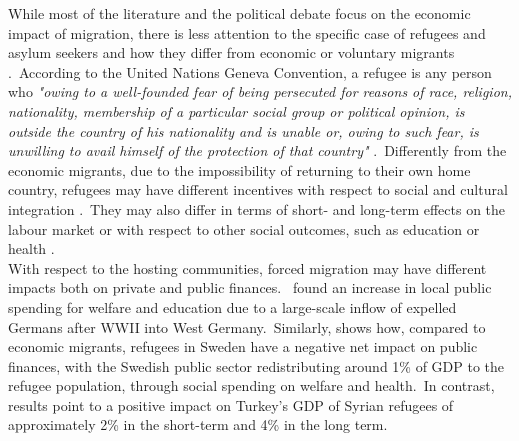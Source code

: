 \documentclass[authoryear,preprint,review,12pt]{elsarticle}
\begin{document}
\noindent
While most of the literature and the political debate focus on the economic impact of migration, there is less attention to the specific case of refugees and asylum seekers and how they differ from economic or voluntary migrants \citep{becker2019}.\ According to the United Nations Geneva Convention, a refugee is any person who \textit{"owing to a well-founded fear of being persecuted for reasons of race, religion, nationality, membership of a particular social group or political opinion, is outside the country of his nationality and is unable or, owing to such fear, is unwilling to avail himself of the protection of that country"} \citep{convention1951}.\ Differently from the economic migrants, due to the impossibility of returning to their own home country, refugees may have different incentives with respect to social and cultural integration \citep{dustmann2017}.\ They may also differ in terms of short- and long-term effects on the labour market \citep{ruiz2018} or with respect to other social outcomes, such as education \citep{bauer2013, becker2020} or health \citep{bauer2017}.\\ 

\noindent
With respect to the hosting communities, forced migration may have different impacts both on private and public finances.\ \cite{chevalier2023} found an increase in local public spending for welfare and education due to a large-scale inflow of expelled Germans after WWII into West Germany.\ Similarly, \cite{ruist2015} shows how, compared to economic migrants, refugees in Sweden have a negative net impact on public finances, with the Swedish public sector redistributing around 1\% of GDP to the refugee population, through social spending on welfare and health.\ In contrast, \cite{Mahia2020TheApproach} results point to a positive impact on Turkey's GDP of Syrian refugees of approximately 2\% in the short-term and 4\% in the long term.\\
\end{document}
